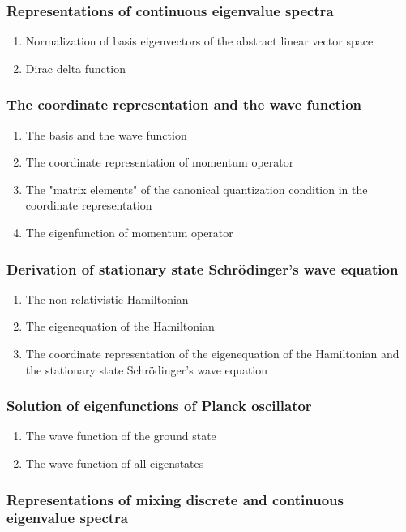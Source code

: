 \documentclass[12pt]{article}
\numberwithin{equation}{section}
\begin{document}
\subsubsection{Representations of continuous eigenvalue spectra}
\begin{enumerate}
\item Normalization of basis eigenvectors of the abstract linear vector space
\item Dirac delta function
\end{enumerate}
\subsubsection{The coordinate representation and the wave function}
\begin{enumerate}
\item The basis and the wave function
\item The coordinate representation of momentum operator
\item The "matrix elements" of the canonical quantization condition in the coordinate representation
\item The eigenfunction of momentum operator
\end{enumerate}
\subsubsection{Derivation of stationary state Schr\"{o}dinger's wave equation}
\begin{enumerate}
\item The non-relativistic Hamiltonian
\item The eigenequation of the Hamiltonian
\item The coordinate representation of the eigenequation of the Hamiltonian and
    the stationary state Schr\"{o}dinger's wave equation
\end{enumerate}
\subsubsection{Solution of eigenfunctions of Planck oscillator}
\begin{enumerate}
\item The wave function of the ground state   
\item The wave function of all eigenstates      
\end{enumerate}
\subsubsection{Representations of mixing discrete and continuous eigenvalue spectra}
\end{document}
